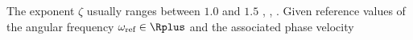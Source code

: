 The exponent $\zeta$ usually ranges between
$1.0$ and $1.5$
\cite{article:KellyJASA2008b},
\cite[112]{book:Duck1990},
\cite{article:WellsUMB1975}.
Given
reference values of
the angular frequency
$\omega_{\text{ref}} \in \Rplus$ and
the associated phase velocity
